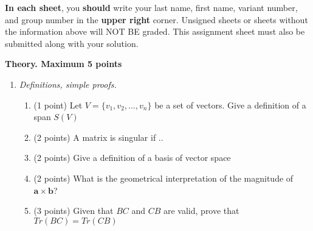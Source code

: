 \documentclass[]{exam}
\begin{document}
\begin{flushleft}
    \textbf{In each sheet}, you \textbf{should} write your last name, first name, variant number, and group number in the \textbf{upper right} corner. Unsigned sheets or sheets without the information above will NOT BE graded. This assignment sheet must also be submitted along with your solution.
\end{flushleft}

\begin{center}
\textbf{Theory. Maximum 5 points}    
\end{center}


\begin{enumerate}
\item  \textit{Definitions, simple proofs.}

\begin{enumerate}
\item (1 point) Let  $V = \{v_1, v_2, ..., v_n\}$ be a set of vectors. Give a definition of a span $S(V)$
\item (2 points) A matrix is singular if ..
\item (2 points) Give a definition of a basis of vector space
\item (2 points) What is the geometrical interpretation of the magnitude of $\mathbf{a}\times \mathbf{b}$?
\item (3 points) Given that $BC$ and $CB$ are valid, prove that
 $Tr(BC) = Tr(CB)$
\end{enumerate}

\end{enumerate}
\end{document}
